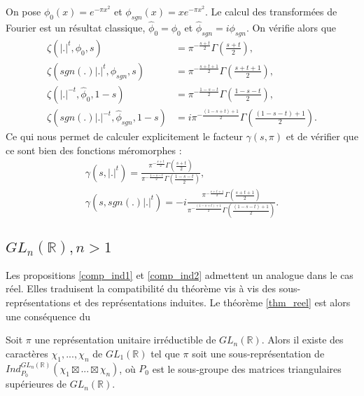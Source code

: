 On pose $\phi_0(x) = e^{-\pi x^2}$ et $\phi_{sgn}(x)=xe^{-\pi x^2}$. Le calcul des transformées de Fourier est un résultat classique, $\hat{\phi}_0 = \phi_0$ et $\hat{\phi}_{sgn} = i\phi_{sgn}$. On vérifie alors que
\begin{align}
\zeta(|.|^t, \phi_0, s) &= \pi^{-\frac{s+t}{2}}\Gamma(\frac{s+t}{2}), \\
\zeta(sgn(.)|.|^t, \phi_{sgn}, s) &= \pi^{-\frac{s+t+1}{2}}\Gamma(\frac{s+t+1}{2}), \\
\zeta(|.|^{-t}, \hat{\phi}_0, 1-s) &= \pi^{-\frac{1-s-t}{2}}\Gamma(\frac{1-s-t}{2}), \\
\zeta(sgn(.)|.|^{-t}, \hat{\phi}_{sgn}, 1-s) &= i\pi^{-\frac{(1-s+t)+1}{2}}\Gamma(\frac{(1-s-t)+1}{2}).
\end{align}
Ce qui nous permet de calculer explicitement le facteur $\gamma(s,\pi)$ et de vérifier que ce sont bien des fonctions méromorphes :
\begin{align}
\gamma(s, |.|^t) = \frac{\pi^{-\frac{s+t}{2}}\Gamma(\frac{s+t}{2})}{\pi^{-\frac{1-s-t}{2}}\Gamma(\frac{1-s-t}{2})}, \\
\gamma(s, sgn(.)|.|^t) = -i\frac{\pi^{-\frac{s+t+1}{2}}\Gamma(\frac{s+t+1}{2})}{\pi^{-\frac{(1-s+t)+1}{2}}\Gamma(\frac{(1-s-t)+1}{2})}.
\end{align}

\subsection{$GL_n(\mathbb{R}), n > 1$}

Les propositions \ref{comp_ind1} et \ref{comp_ind2} admettent un analogue dans le cas réel. Elles traduisent la compatibilité du théorème vis à vis des sous-représentations et des représentations induites. Le théorème \ref{thm_reel} est alors une conséquence du
\begin{theoreme}
Soit $\pi$ une représentation unitaire irréductible de $GL_n(\mathbb{R})$. Alors il existe des caractères $\chi_1, ..., \chi_n$ de $GL_1(\mathbb{R})$ tel que $\pi$ soit une sous-représentation de $Ind_{P_0}^{GL_n(\mathbb{R})}(\chi_1 \boxtimes ... \boxtimes \chi_n)$, où $P_0$ est le sous-groupe des matrices triangulaires supérieures de $GL_n(\mathbb{R})$.
\end{theoreme}